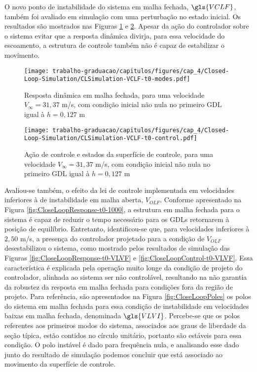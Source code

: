 \newpage
O novo ponto de instabilidade do sistema em malha fechada, $\gls{VCLF}$, também foi avaliado em simulação com uma perturbação no estado inicial. Os resultados são mostrados nas Figuras \ref{fig:CloseLoopResponse-t0-VCLF} e \ref{fig:CloseLoopControl-t0-VCLF}. Apesar da ação do controlador sobre o sistema evitar que a resposta dinâmica divirja, para essa velocidade do escoamento, a estrutura de controle também não é capaz de estabilizar o movimento.

\begin{figure}[ht!]
    \centering
    \caption{Resposta dinâmica em malha fechada, para uma velocidade $V_{\infty} = 31,37$ m/s, com condição inicial não nula no primeiro \gls{GDL} igual à $h=0,127$ m}
    \noindent\texttt{[image: trabalho-graduacao/capitulos/figures/cap\_4/Closed-Loop-Simulation/CLSimulation-VCLF-t0-modes.pdf]}

    \label{fig:CloseLoopResponse-t0-VCLF}
\end{figure}

\begin{figure}[ht!]
    \centering
    \caption{Ação de controle e estados da superfície de controle, para uma velocidade $V_{\infty} = 31,37$ m/s, com condição inicial não nula no primeiro \gls{GDL} igual à $h=0,127$ m}
    \noindent\texttt{[image: trabalho-graduacao/capitulos/figures/cap\_4/Closed-Loop-Simulation/CLSimulation-VCLF-t0-control.pdf]}
    \label{fig:CloseLoopControl-t0-VCLF}
\end{figure}

Avaliou-se também, o efeito da lei de controle implementada em velocidades inferiores à de instabilidade em malha aberta, $V_{OLF}$. Conforme apresentado na Figura \ref{fig:CloseLoopResponse-t0-1000}, a estrutura em malha fechada para o sistema é capaz de reduzir o tempo necessário para os \gls{GDL}s retornarem à posição de equilíbrio. Entretanto, identificou-se que, para velocidades inferiores à $2,50$ m/s, a presença do controlador projetado para a condição de $V_{OLF}$ desestabilizou o sistema, como mostrado pelos resultados de simulação das Figuras \ref{fig:CloseLoopResponse-t0-VLVF} e \ref{fig:CloseLoopControl-t0-VLVF}. Essa característica é explicada pela operação muito longe da condição de projeto do controlador, alinhada ao sistema ser não controlável, resultando na não garantia da robustez da resposta em malha fechada para condições fora da região de projeto. Para referência, são apresentados na Figura \ref{fig:CloseLoopPoles} os polos do sistema em malha fechada para essa condição de instabilidade em velocidades baixas em malha fechada, denominada $\gls{VLVI}$. Percebe-se que os polos referentes aos primeiros modos do sistema, associados aos graus de liberdade da seção típica, estão contidos no círculo unitário, portanto são estáveis para essa condição. O polo instável é dado para frequência nula, e analisando esse dado junto do resultado de simulação podemos concluir que está associado ao movimento da superfície de controle.

